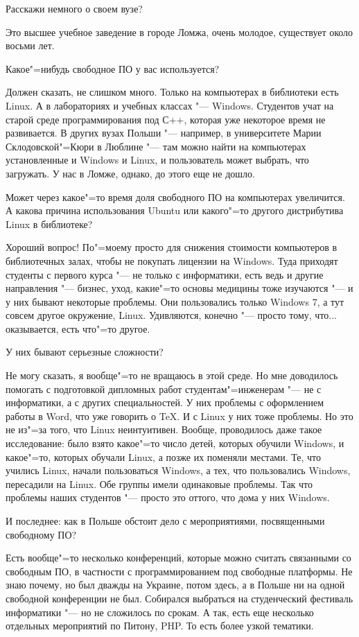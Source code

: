 \documentclass[10pt, a5paper]{article}
\begin{document}
\q Расскажи немного о своем вузе?

\noindent Это высшее учебное заведение в городе Ломжа, очень молодое, существует около восьми лет. 

\q Какое"=нибудь свободное ПО у вас используется?

\a Должен сказать, не слишком много. Только на компьютерах в библиотеки есть Linux. А в лабораториях и учебных классах "--- Windows. Студентов учат на старой среде программирования под С++, которая уже некоторое время не развивается. В других вузах Польши "--- например, в университете Марии Склодовской"=Кюри в Люблине "--- там можно найти на компьютерах установленные и Windows и Linux, и пользователь может выбрать, что загружать. У нас в Ломже, однако, до этого еще не дошло.

\q Может через какое"=то время доля свободного ПО на компьютерах увеличится. А какова причина использования Ubuntu или какого"=то другого дистрибутива Linux в библиотеке?

\a Хороший вопрос! По"=моему просто для снижения стоимости компьютеров в библиотечных залах, чтобы не покупать лицензии на Windows. Туда приходят студенты с первого курса "--- не только с информатики, есть ведь и другие направления "--- бизнес, уход, какие"=то основы медицины тоже изучаются "--- и у них бывают некоторые проблемы. Они пользовались только Windows 7, а тут совсем другое окружение, Linux. Удивляются, конечно "--- просто тому, что... оказывается, есть что"=то другое. 

\q У них бывают серьезные сложности?

\a Не могу сказать, я вообще"=то не вращаюсь в этой среде. Но мне доводилось помогать с подготовкой дипломных работ студентам"=инженерам "--- не с информатики, а с других специальностей. У них проблемы с оформлением работы в Word, что уже говорить о TeX. И с Linux у них тоже проблемы. Но это не из"=за того, что Linux неинтуитивен. Вообще, проводилось даже такое исследование: было взято какое"=то число детей, которых обучили Windows, и какое"=то, которых обучали Linux, а позже их поменяли местами. Те, что учились Linux, начали пользоваться Windows, а тех, что пользовались Windows, пересадили на Linux. Обе группы имели одинаковые проблемы. Так что проблемы наших студентов "--- просто это оттого, что дома у них Windows. 

\q И последнее: как в Польше обстоит дело с мероприятиями, посвященными свободному ПО?

\a Есть вообще"=то несколько конференций, которые можно считать связанными со свободным ПО, в частности с программированием под свободные платформы. Не знаю почему, но был дважды на Украине, потом здесь, а в Польше ни на одной свободной конференции не был. Собирался выбраться на студенческий фестиваль информатики "--- но не сложилось по срокам. А так, есть еще несколько отдельных мероприятий по Питону, PHP. То есть более узкой тематики.
\end{document}
